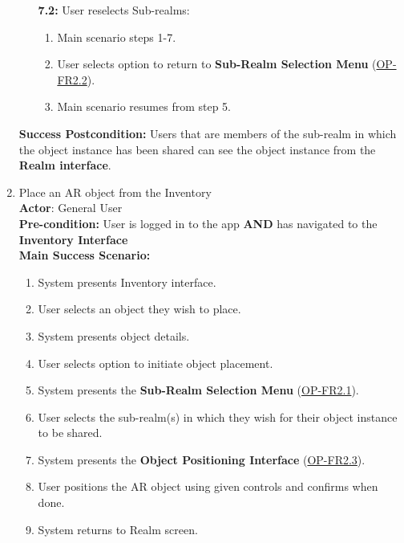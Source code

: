 \documentclass{article}
\begin{document}
\begin{enumerate}[label=\textbf{UC\arabic*}]
\begin{itemize}
            \item[{\bf 7.2:}] User reselects Sub-realms:
            \begin{enumerate}[label=\textbf{\arabic*.}]
                \item Main scenario steps 1-7.
                \item User selects option to return to \textbf{Sub-Realm Selection Menu} (\hyperref[ssub:object_placement]{OP-FR2.2}).
                \item Main scenario resumes from step 5.
            \end{enumerate}
        \end{itemize}
    
        \textbf{Success Postcondition:} Users that are members of the sub-realm in which the object instance has been shared can see the object instance from the \textbf{Realm interface}.
    
    \item \label{uc:8} Place an AR object from the Inventory \\ 
        \textbf{Actor}: General User \\ 
        \textbf{Pre-condition:} User is logged in to the app \textbf{AND} has navigated to the \textbf{Inventory Interface} \\
    
        \textbf{Main Success Scenario:}
        \begin{enumerate}[label=\textbf{\arabic*.}]
            \item System presents Inventory interface.
            \item User selects an object they wish to place.
            \item System presents object details.
            \item User selects option to initiate object placement.
            \item System presents the \textbf{Sub-Realm Selection Menu} (\hyperref[ssub:object_placement]{OP-FR2.1}).
            \item User selects the sub-realm(s) in which they wish for their object instance to be shared.
            \item System presents the \textbf{Object Positioning Interface} (\hyperref[ssub:object_placement]{OP-FR2.3}).
            \item User positions the AR object using given controls and confirms when done.
            \item System returns to Realm screen.
        \end{enumerate}
    

\end{enumerate}
\end{document}
